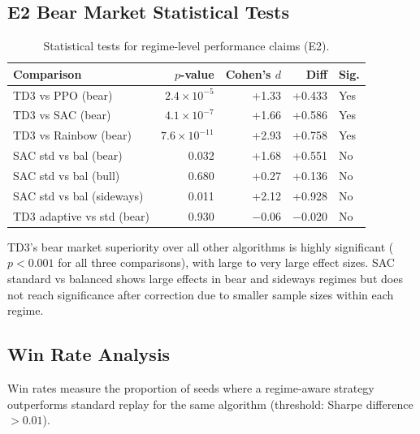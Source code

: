 \documentclass[11pt,a4paper]{article}
\begin{document}
\subsection{E2 Bear Market Statistical Tests}

\begin{table}[H]
\centering
\small
\caption{Statistical tests for regime-level performance claims (E2).}
\label{tab:e2-stats}
\begin{tabular}{@{}lrrrl@{}}
\toprule
\textbf{Comparison} & \textbf{$p$-value} & \textbf{Cohen's $d$} & \textbf{Diff} & \textbf{Sig.} \\
\midrule
TD3 vs PPO (bear) & $2.4 \times 10^{-5}$ & +1.33 & +0.433 & Yes \\
TD3 vs SAC (bear) & $4.1 \times 10^{-7}$ & +1.66 & +0.586 & Yes \\
TD3 vs Rainbow (bear) & $7.6 \times 10^{-11}$ & +2.93 & +0.758 & Yes \\
SAC std vs bal (bear) & 0.032 & +1.68 & +0.551 & No \\
SAC std vs bal (bull) & 0.680 & +0.27 & +0.136 & No \\
SAC std vs bal (sideways) & 0.011 & +2.12 & +0.928 & No \\
TD3 adaptive vs std (bear) & 0.930 & $-$0.06 & $-$0.020 & No \\
\bottomrule
\end{tabular}
\end{table}

TD3's bear market superiority over all other algorithms is highly significant ($p < 0.001$ for all three comparisons), with large to very large effect sizes. SAC standard vs balanced shows large effects in bear and sideways regimes but does not reach significance after correction due to smaller sample sizes within each regime.

\subsection{Win Rate Analysis}

Win rates measure the proportion of seeds where a regime-aware strategy outperforms standard replay for the same algorithm (threshold: Sharpe difference $> 0.01$).
\end{document}
